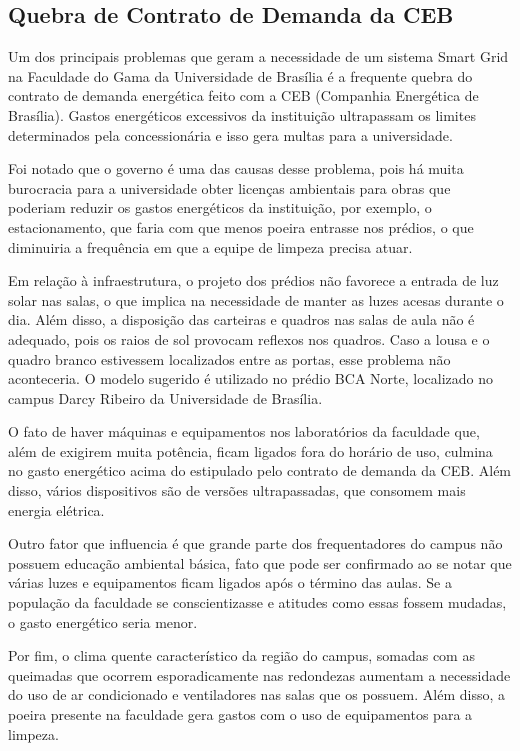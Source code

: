 \subsection{Quebra de Contrato de Demanda da CEB}
Um dos principais problemas que geram a necessidade de um sistema Smart Grid na Faculdade do Gama da Universidade de Brasília é a frequente quebra do contrato de demanda energética feito com a CEB (Companhia Energética de Brasília). Gastos energéticos excessivos da instituição ultrapassam os limites determinados pela concessionária e isso gera multas para a universidade. 
\par Foi notado que o governo é uma das causas desse problema, pois há muita burocracia para a universidade obter licenças ambientais para obras que poderiam reduzir os gastos energéticos da instituição, por exemplo, o estacionamento, que faria com que menos poeira entrasse nos prédios, o que diminuiria a frequência em que a equipe de limpeza precisa atuar.
\par Em relação à infraestrutura, o projeto dos prédios não favorece a entrada de luz solar nas salas, o que implica na necessidade de manter as luzes acesas durante o dia. Além disso, a disposição das carteiras e quadros nas salas de aula não é adequado, pois os raios de sol provocam reflexos nos quadros. Caso a lousa e o quadro branco estivessem localizados entre as portas, esse problema não aconteceria. O modelo sugerido é utilizado no prédio BCA Norte, localizado no campus Darcy Ribeiro da Universidade de Brasília. 
\par O fato de haver máquinas e equipamentos nos laboratórios da faculdade que, além de exigirem muita potência, ficam ligados fora do horário de uso, culmina no gasto energético acima do estipulado pelo contrato de demanda da CEB. Além disso, vários dispositivos são de versões ultrapassadas, que consomem mais energia elétrica.  
\par Outro fator que influencia é que grande parte dos frequentadores do campus não possuem educação ambiental básica, fato que pode ser confirmado ao se notar que várias luzes e equipamentos ficam ligados após o término das aulas. Se a população da faculdade se conscientizasse e atitudes como essas fossem mudadas, o gasto energético seria menor. 
\par Por fim, o clima quente característico da região do campus, somadas com as queimadas que ocorrem esporadicamente nas redondezas aumentam a necessidade do uso de ar condicionado e ventiladores nas salas que os possuem. Além disso, a poeira presente na faculdade gera gastos com o uso de equipamentos para a limpeza.
